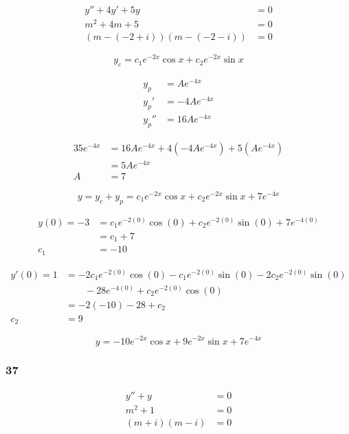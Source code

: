 \documentclass{article}
\begin{document}
\begin{align*}
  y'' + 4y' + 5y               & = 0 \\
  m^2 + 4m + 5                 & = 0 \\
  (m - (-2 + i))(m - (-2 - i)) & = 0
\end{align*}

\[y_c = c_1 e^{-2x} \cos x + c_2 e^{-2x} \sin x\]

\begin{align*}
  y_p   & = Ae^{-4x}   \\
  y_p'  & = -4Ae^{-4x} \\
  y_p'' & = 16Ae^{-4x}
\end{align*}

\begin{align*}
  35e^{-4x} & = 16Ae^{-4x} + 4 (-4Ae^{-4x}) + 5 (Ae^{-4x}) \\
            & = 5Ae^{-4x}                                  \\
  A         & = 7
\end{align*}

\[y = y_c + y_p = c_1 e^{-2x} \cos x + c_2 e^{-2x} \sin x + 7e^{-4x}\]

\begin{align*}
  y(0) = -3 & = c_1 e^{-2 (0)} \cos (0) + c_2 e^{-2 (0)} \sin (0) + 7e^{-4 (0)} \\
            & = c_1 + 7                                                         \\
  c_1       & = -10
\end{align*}

\begin{align*}
  y'(0) = 1 & = -2 c_1 e^{-2 (0)} \cos (0) - c_1 e^{-2 (0)} \sin (0) - 2 c_2 e^{-2 (0)} \sin (0) \\
            & \qquad - 28e^{-4 (0)} + c_2 e^{-2 (0)} \cos (0)                                    \\
            & = -2 (-10) - 28 + c_2                                                              \\
  c_2       & = 9
\end{align*}

\[y = -10e^{-2x} \cos x + 9e^{-2x} \sin x + 7e^{-4x}\]

\subsubsection{37}

\begin{align*}
  y'' + y         & = 0 \\
  m^2 + 1         & = 0 \\
  (m + i) (m - i) & = 0
\end{align*}
\end{document}

